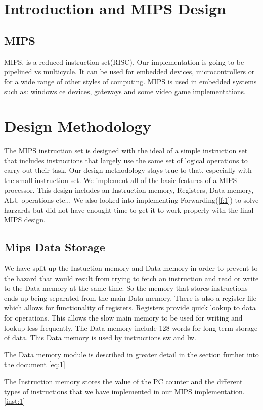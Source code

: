 \documentclass{llncs}
\begin{document}
\section{Introduction and MIPS Design}


\subsection{MIPS}
MIPS. is a reduced instruction set(RISC),  Our implementation is going to be pipelined vs multicycle.  It can be used for embedded devices,
microcontrollers or for a wide range of other styles of computing.  MIPS is used in embedded systems such as: windows ce devices, gateways and some video game implementations.

\section{Design Methodology}
The MIPS instruction set is designed with the ideal of a simple instruction set that includes instructions that largely use the same set of
 logical operations to carry out their task.  Our design methodology stays true to that, especially with the small instruction set.  We implement
 all of the basic features of a MIPS processor.  This design includes an Instruction memory, Registers, Data memory, ALU operations etc...
 We also looked into implementing Forwarding(\ref{f:1}) to solve harzards but did not have enought time to get it to work properly with the final MIPS design. 
 \subsection{Mips Data Storage}
 We have split up the Instuction memory and Data memory in order to prevent to the hazard that would result from trying to fetch
 an instruction and read or write to the Data memory at the same time.  So the memory that stores instructions ends up being separated from the main Data memory.  There is also a register file which allows for functionality of registers. Registers provide quick lookup to data for operations.  This allows the slow main memory to be used for writing and lookup less frequently.  The Data memory include 128 words for long term storage of data.  This Data memory is used by instructions sw and lw.

 The Data memory module is described in greater detail in the section further into the document \ref{eq:1}

 The Instruction memory stores the value of the PC counter and the different types of instructions that we have implemented in our MIPS implementation.  \ref{inst:1} \cite{1}
\end{document}
